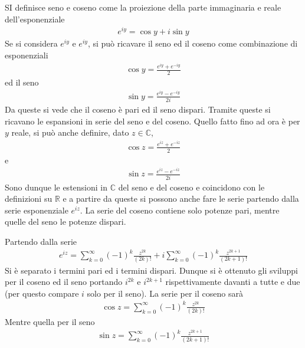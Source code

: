 \documentclass[a4paper, oneside]{article}
\begin{document}
\begin{definition}
    SI definisce seno e coseno come la proiezione della parte immaginaria e reale dell'esponenziale
    \begin{align}
        e^{iy} = \cos y + i\sin y
    \end{align}
    Se si considera $e^{iy}$ e $e^{iy}$, si può ricavare il seno ed il 
    coseno come combinazione di esponenziali
    \begin{align}
        \cos y = \frac{e^{iy} + e^{-iy}}{2}
    \end{align}
    ed il seno 
    \begin{align}
        \sin y = \frac{e^{iy} - e^{-iy}}{2i}
    \end{align}
    Da queste si vede che il coseno è pari ed il seno dispari. Tramite queste si ricavano 
    le espansioni in serie del seno e del coseno. Quello fatto fino ad ora è per $y$ reale, 
    si può anche definire, dato $z \in \mathbb{C}$, 
    \begin{align}
        \cos z = \frac{e^{iz} + e^{-iz}}{2} 
    \end{align}
    e 
    \begin{align}
        \sin z = \frac{e^{iz} - e^{-iz}}{2i}
    \end{align}
    Sono dunque le estensioni in $\mathbb{C}$ del seno e del coseno e 
    coincidono con le definizioni su $\mathbb{R}$ e a partire da queste 
    si possono anche fare le serie partendo dalla serie esponenziale $e^{iz}$. La 
    serie del coseno contiene solo potenze pari, mentre quelle del seno le 
    potenze dispari. 
\end{definition} \noindent
Partendo dalla serie
\begin{gather*}
    e^{iz} = \sum_{k = 0}^{\infty } (-1)^{k} \frac{z^{2k}}{(2k)!} + i \sum_{k = 0}^{\infty } (-1)^{k} \frac{z^{2k + 1}}{(2k + 1)!}  
\end{gather*}
Si è separato i termini pari ed i termini dispari. Dunque si è ottenuto gli sviluppi per
il coseno ed il seno portando $i^{2k}$ e $i^{2k + 1}$ rispettivamente davanti a tutte e due
(per questo compare $i$ solo per il seno). La serie per il coseno sarà
\begin{gather*}
    \cos z = \sum_{k = 0}^{\infty } (-1)^{k} \frac{z^{2k}}{(2k)!}  
\end{gather*}
Mentre quella per il seno 
\begin{gather*}
    \sin z = \sum_{k = 0}^{\infty } (-1)^{k} \frac{z^{2k + 1}}{(2k + 1)!} 
\end{gather*}
\end{document}
